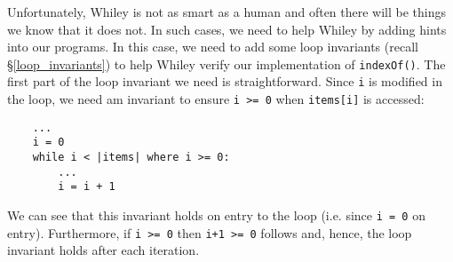 Unfortunately, Whiley is not as smart as a human and often there will
be things we know that it does not.  In such cases, we need to help
Whiley by adding hints into our programs.  In this case, we need to
add some loop invariants (recall \S\ref{loop_invariants}) to help
Whiley verify our implementation of \lstinline{indexOf()}.  The first
part of the loop invariant we need is straightforward.  Since
\lstinline{i} is modified in the loop, we need am invariant to ensure
\lstinline{i >= 0} when \lstinline{items[i]} is accessed:

\begin{lstlisting}
    ...
    i = 0
    while i < |items| where i >= 0:
        ...
        i = i + 1    
\end{lstlisting}
We can see that this invariant holds on entry to the loop (i.e. since
\lstinline{i = 0} on entry).  Furthermore, if \lstinline{i >= 0} then \lstinline{i+1 >= 0} follows and, hence, the loop
invariant holds after each iteration.
